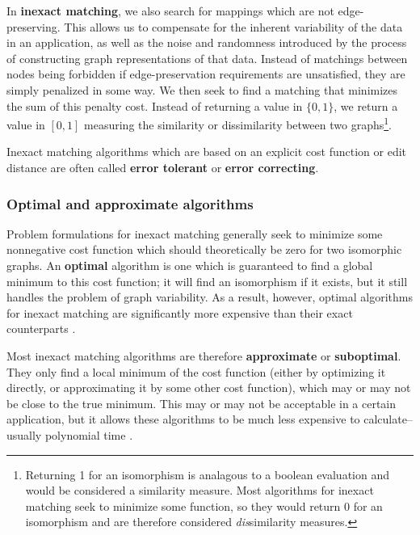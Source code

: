 \documentclass[12pt]{thesis}
\theoremstyle{plain}
\theoremstyle{definition}
\theoremstyle{remark}
\begin{document}
In \textbf{inexact matching}, we also search for mappings which are not edge-preserving. This allows us to compensate for the inherent variability of the data in an application, as well as the noise and randomness introduced by the process of constructing graph representations of that data. Instead of matchings between nodes being forbidden if edge-preservation requirements are unsatisfied, they are simply penalized in some way. We then seek to find a matching that minimizes the sum of this penalty cost. Instead of returning a value in $\{0,1\}$, we return a value in $[0,1]$ measuring the similarity or dissimilarity between two graphs\footnote{Returning 1 for an isomorphism is analagous to a boolean evaluation and would be considered a similarity measure. Most algorithms for inexact matching seek to minimize some function, so they would return 0 for an isomorphism and are therefore considered \textit{dis}similarity measures.}.

Inexact matching algorithms which are based on an explicit cost function or edit distance are often called \textbf{error tolerant} or \textbf{error correcting}. 

\subsubsection{Optimal and approximate algorithms}

Problem formulations for inexact matching generally seek to minimize some nonnegative cost function which should theoretically be zero for two isomorphic graphs. An \textbf{optimal} algorithm is one which is guaranteed to find a global minimum to this cost function; it will find an isomorphism if it exists, but it still handles the problem of graph variability. As a result, however, optimal algorithms for inexact matching are significantly more expensive than their exact counterparts \cite{Conte_2004}.

Most inexact matching algorithms are therefore \textbf{approximate} or \textbf{suboptimal}. They only find a local minimum of the cost function (either by optimizing it directly, or approximating it by some other cost function), which may or may not be close to the true minimum. This may or may not be acceptable in a certain application, but it allows these algorithms to be much less expensive to calculate--usually polynomial time  \cite{Conte_2004}.
\end{document}
